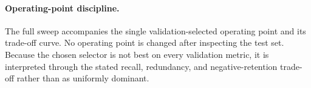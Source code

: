 \paragraph{Operating-point discipline.}
The full sweep accompanies the single validation-selected operating point and
its trade-off curve.  No operating point is changed after inspecting the test
set.  Because the chosen selector is not best on every validation metric, it is
interpreted through the stated recall, redundancy, and negative-retention
trade-off rather than as uniformly dominant.
